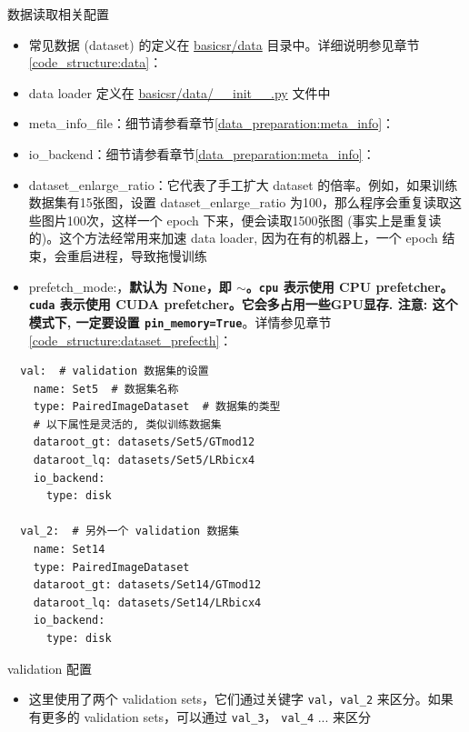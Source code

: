 \documentclass[../main.tex]{subfiles}
\begin{document}
\begin{exampleBox}[righthand ratio=0.00, sidebyside, sidebyside align=center, lower separated=false]{数据读取相关配置}
    \begin{itemize}
        \item 常见数据 (dataset) 的定义在 \href{https://github.com/XPixelGroup/BasicSR/blob/master/basicsr/data}{basicsr/data} 目录中。详细说明参见章节\ref{code_structure:data}：
        \item data loader 定义在 \href{https://github.com/XPixelGroup/BasicSR/blob/master/basicsr/data/__init__.py}{basicsr/data/\_\_init\_\_.py} 文件中
        \item meta\_info\_file：细节请参看章节\ref{data_preparation:meta_info}： 
        \item io\_backend：细节请参看章节\ref{data_preparation:meta_info}： 
        \item dataset\_enlarge\_ratio：它代表了手工扩大 dataset 的倍率。例如，如果训练数据集有15张图，设置 dataset\_enlarge\_ratio 为100，那么程序会重复读取这些图片100次，这样一个 epoch 下来，便会读取1500张图 (事实上是重复读的)。这个方法经常用来加速 data loader, 因为在有的机器上，一个 epoch 结束，会重启进程，导致拖慢训练
        \item prefetch\_mode:，\textbf{默认为 None，即 $\sim$。\texttt{cpu} 表示使用 CPU prefetcher。\texttt{cuda} 表示使用 CUDA prefetcher。它会多占用一些GPU显存. 注意: 这个模式下, 一定要设置 \texttt{pin\_memory=True}}。详情参见章节\ref{code_structure:dataset_prefecth}：
    \end{itemize}
\end{exampleBox}

\begin{verbatim}
  val:  # validation 数据集的设置
    name: Set5  # 数据集名称
    type: PairedImageDataset  # 数据集的类型
    # 以下属性是灵活的, 类似训练数据集
    dataroot_gt: datasets/Set5/GTmod12
    dataroot_lq: datasets/Set5/LRbicx4
    io_backend:
      type: disk

  val_2:  # 另外一个 validation 数据集
    name: Set14
    type: PairedImageDataset
    dataroot_gt: datasets/Set14/GTmod12
    dataroot_lq: datasets/Set14/LRbicx4
    io_backend:
      type: disk
\end{verbatim}

\begin{exampleBox}[righthand ratio=0.00, sidebyside, sidebyside align=center, lower separated=false]{validation 配置}
    \begin{itemize}
        \item 这里使用了两个 validation sets，它们通过关键字 \texttt{val}，\texttt{val\_2} 来区分。如果有更多的 validation sets，可以通过 \texttt{val\_3}， \texttt{val\_4} ... 来区分
    \end{itemize}
\end{exampleBox}
\end{document}

